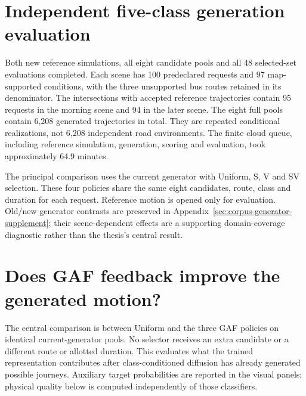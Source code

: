 \FloatBarrier
\section{Independent five-class generation evaluation}
\label{sec:expanded-generation}

Both new reference simulations, all eight candidate pools and all 48 selected-set evaluations completed. Each scene has 100 predeclared requests and 97 map-supported conditions, with the three unsupported bus routes retained in its denominator. The intersections with accepted reference trajectories contain 95 requests in the morning scene and 94 in the later scene. The eight full pools contain 6,208 generated trajectories in total. They are repeated conditional realizations, not 6,208 independent road environments. The finite cloud queue, including reference simulation, generation, scoring and evaluation, took approximately 64.9 minutes.


The principal comparison uses the current generator with Uniform, S, V and SV selection. These four policies share the same eight candidates, route, class and duration for each request. Reference motion is opened only for evaluation. Old/new generator contrasts are preserved in Appendix~\ref{sec:corpus-generator-supplement}; their scene-dependent effects are a supporting domain-coverage diagnostic rather than the thesis's central result.

\FloatBarrier
\section{Does GAF feedback improve the generated motion?}
\label{sec:expanded-feedback}
The central comparison is between Uniform and the three GAF policies on identical current-generator pools. No selector receives an extra candidate or a different route or allotted duration. This evaluates what the trained representation contributes after class-conditioned diffusion has already generated possible journeys. Auxiliary target probabilities are reported in the visual panels; physical quality below is computed independently of those classifiers.

